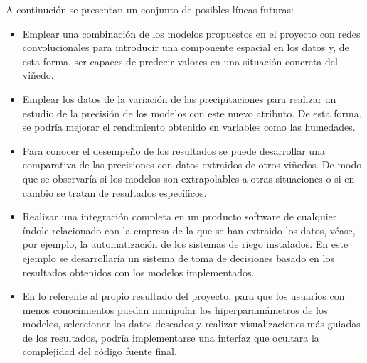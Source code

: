 A continución se presentan un conjunto de posibles líneas futuras:
\begin{itemize}
    \item Emplear una combinación de los modelos propuestos en el proyecto con redes convolucionales
        para introducir una componente espacial en los datos y, de esta forma, ser capaces de predecir valores
        en una situación concreta del viñedo.
    \item Emplear los datos de la variación de las precipitaciones para realizar un estudio de la precisión
        de los modelos con este nuevo atributo. De esta forma, se podría mejorar el rendimiento obtenido
        en variables como las humedades. 
    \item Para conocer el desempeño de los resultados se puede desarrollar una comparativa de las precisiones
        con datos extraidos de otros viñedos. De modo que se observaría si los modelos son extrapolables
        a otras situaciones o si en cambio se tratan de resultados específicos.
    \item Realizar una integración completa en un producto software de cualquier índole relacionado con
        la empresa de la que se han extraido los datos, véase, por ejemplo, la automatización de los sistemas de riego
        instalados. En este ejemplo se desarrollaría un sistema de toma de decisiones basado en los resultados obtenidos
        con los modelos implementados.
    \item En lo referente al propio resultado del proyecto, para que los usuarios con menos conocimientos puedan manipular los
        hiperparamámetros de los modelos, seleccionar los datos deseados y realizar visualizaciones más guiadas de los resultados, 
        podría implementarse una interfaz que ocultara la complejidad del código fuente final.
\end{itemize}